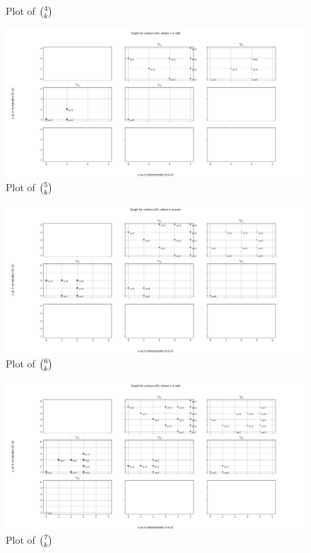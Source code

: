 \documentclass[PermutationsCombinationsWhyWholeNumber.tex]{subfiles}
\begin{document}
\begin{appendices}
\begin{figure}[ph!]
	\caption{Plot of $\binom{4}{k}$}
	\label{4Ck}
\end{figure}
\begin{figure}[ph!]	
	\includegraphics[width=\linewidth]{5Ck.png}
	\caption{Plot of $\binom{5}{k}$}
	\label{5Ck}
\end{figure}
\begin{figure}[ph!]	
	\includegraphics[width=\linewidth]{6Ck.png}
	\caption{Plot of $\binom{6}{k}$}
	\label{6Ck}
\end{figure}
\begin{figure}[ph!]	
	\includegraphics[width=\linewidth]{7Ck.png}
	\caption{Plot of $\binom{7}{k}$}

\end{figure}
\end{appendices}
\end{document}
